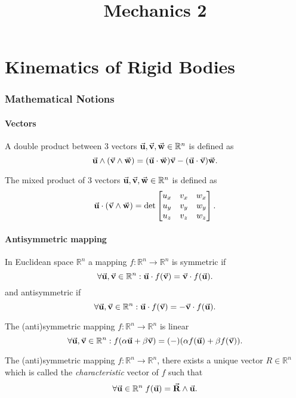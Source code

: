 \documentclass[a4paper,12pt]{article}
\title{Mechanics 2}
\begin{document}
\maketitle
\part{Kinematics of Rigid Bodies}
\section{Mathematical Notions}

\subsection{Vectors}
\begin{definition}
	A double product between 3 vectors $\va{u},\va{v},\va{w}\in \mathbb{R}^n$ is defined as
	\[
		\va{u}\land(\va{v}\land \va{w})= (\va{u}\cdot \va{w})\va{v} - (\va{u}\cdot \va{v})\va{w}
		.\]
\end{definition}

\begin{definition}
	The mixed product of 3 vectors $\va{u},\va{v},\va{w}\in \mathbb{R}^n$ is defined as
	\[
		\va{u}\cdot (\va{v}\land \va{w})= \det \begin{bmatrix} u_x&v_x&w_x\\u_y&v_y&w_y\\u_z&v_z&w_z \end{bmatrix}
		.\]
\end{definition}

\subsection{Antisymmetric mapping}

\begin{definition}
	In Euclidean space $\mathbb{R}^n$ a mapping $f:\mathbb{R}^n\to \mathbb{R}^n$ is symmetric if
	\[
		\forall \va{u},\va{v}\in \mathbb{R}^n: \va{u}\cdot f(\va{v})=\va{v}\cdot f(\va{u})
		.\]
	and antisymmetric if
	\[
		\forall \va{u},\va{v}\in \mathbb{R}^n: \va{u}\cdot f(\va{v})=-\va{v}\cdot f(\va{u})
		.\]
\end{definition}
\begin{remark}
	The (anti)symmetric mapping $f:\mathbb{R}^n\to \mathbb{R}^n$ is linear
	\[
		\forall \va{u},\va{v}\in \mathbb{R}^n: f(\alpha \va{u}+\beta \va{v})=(-)(\alpha f(\va{u})+\beta f(\va{v}))
		.\]
\end{remark}
\begin{theorem}
	The (anti)symmetric mapping $f:\mathbb{R}^n\to \mathbb{R}^n$, there exists a unique vector $R\in \mathbb{R}^n$ which is called the \emph{characteristic} vector of $f$ such that
	\[
		\forall \va{u}\in\mathbb{R}^n\;f(\va{u})=\va{R}\land \va{u}
		.\]
\end{theorem}
\newpage
\end{document}
